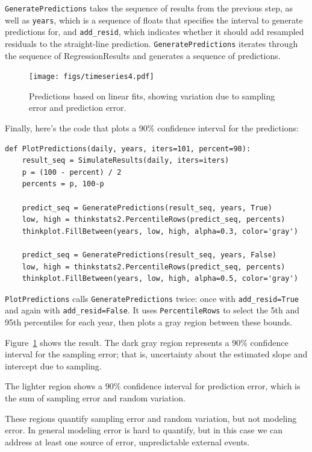 \documentclass[12pt]{book}
\theoremstyle{exercise}
\begin{document}
{\tt GeneratePredictions} takes the sequence of results from the
previous step, as well as {\tt years}, which is a sequence of
floats that specifies the interval to generate predictions for,
and \verb"add_resid", which indicates whether it should add resampled
residuals to the straight-line prediction.
{\tt GeneratePredictions} iterates through the sequence of
RegressionResults and generates a sequence of predictions.%

\begin{figure}
\centerline{\texttt{[image: figs/timeseries4.pdf]}}
\caption{Predictions based on linear fits, showing variation due
to sampling error and prediction error.}%
\label{timeseries4}
\end{figure}

Finally, here's the code that plots a 90\% confidence interval for
the predictions:%

\begin{verbatim}
def PlotPredictions(daily, years, iters=101, percent=90):
    result_seq = SimulateResults(daily, iters=iters)
    p = (100 - percent) / 2
    percents = p, 100-p

    predict_seq = GeneratePredictions(result_seq, years, True)
    low, high = thinkstats2.PercentileRows(predict_seq, percents)
    thinkplot.FillBetween(years, low, high, alpha=0.3, color='gray')

    predict_seq = GeneratePredictions(result_seq, years, False)
    low, high = thinkstats2.PercentileRows(predict_seq, percents)
    thinkplot.FillBetween(years, low, high, alpha=0.5, color='gray')
\end{verbatim}

{\tt PlotPredictions} calls {\tt GeneratePredictions} twice: once
with \verb"add_resid=True" and again with \verb"add_resid=False".
It uses {\tt PercentileRows} to select the 5th and 95th percentiles
for each year, then plots a gray region between these bounds.%

Figure~\ref{timeseries4} shows the result.
The dark gray region represents a 90\% confidence interval for
the sampling error; that is, uncertainty about the estimated
slope and intercept due to sampling.%

The lighter region shows
a 90\% confidence interval for prediction error, which is the
sum of sampling error and random variation.%

These regions quantify sampling error and random variation, but
not modeling error.  In general modeling error is hard to quantify,
but in this case we can address at least one source of error,
unpredictable external events.%
\end{document}
